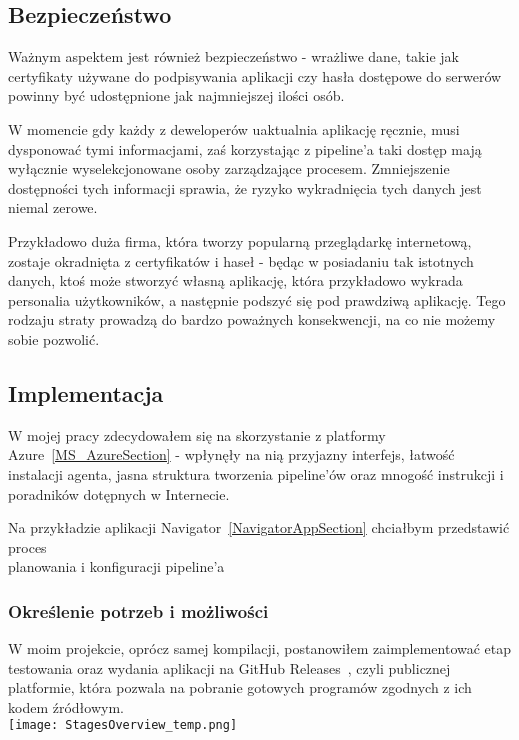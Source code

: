 \subsection{Bezpieczeństwo}
Ważnym aspektem jest również bezpieczeństwo - wrażliwe dane, takie jak certyfikaty używane do podpisywania aplikacji czy
hasła dostępowe do serwerów powinny być udostępnione jak najmniejszej ilości osób.

W momencie gdy każdy z deweloperów uaktualnia aplikację ręcznie, musi dysponować tymi informacjami,
zaś korzystając z pipeline'a taki dostęp mają wyłącznie wyselekcjonowane osoby zarządzające procesem.
Zmniejszenie dostępności tych informacji sprawia, że ryzyko wykradnięcia tych danych jest niemal zerowe.

Przykładowo duża firma, która tworzy popularną przeglądarkę internetową, zostaje okradnięta z certyfikatów i haseł - 
będąc w posiadaniu tak istotnych danych, ktoś może stworzyć własną aplikację, która przykładowo wykrada personalia użytkowników, 
a następnie podszyć się pod prawdziwą aplikację. 
Tego rodzaju straty prowadzą do bardzo poważnych konsekwencji, na co nie możemy sobie pozwolić.
\newpage

\subsection{Implementacja}
W mojej pracy zdecydowałem się na skorzystanie z platformy Azure~\ref{MS_AzureSection} - wpłynęły
na nią przyjazny interfejs, łatwość instalacji agenta, jasna struktura tworzenia pipeline'ów 
oraz mnogość instrukcji i poradników dotępnych w Internecie.

Na przykładzie aplikacji Navigator~\ref{NavigatorAppSection} chciałbym przedstawić proces \\
planowania i konfiguracji pipeline'a \todo{}

\subsubsection{Określenie potrzeb i możliwości}
W moim projekcie, oprócz samej kompilacji, postanowiłem zaimplementować etap testowania 
oraz wydania aplikacji na GitHub Releases~\todo{}, czyli publicznej platformie, która 
pozwala na pobranie gotowych programów zgodnych z ich kodem źródłowym. \\
\texttt{[image: StagesOverview\_temp.png]}

